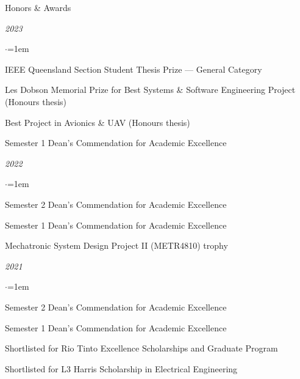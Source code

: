 \documentclass{resume} %
\begin{document}
\newpage

\begin{rSection}{Honors \& Awards} \itemsep -2pt

    \item \textit{2023}
    \begin{list}{$\cdot$}{\leftmargin=1em} %
        \item IEEE Queensland Section Student Thesis Prize --- General Category
        \item Les Dobson Memorial Prize for Best Systems \& Software Engineering Project (Honours thesis)
        \item Best Project in Avionics \& UAV (Honours thesis)
        \item Semester 1 Dean's Commendation for Academic Excellence
    \end{list}

    \vspace{1em}

    \item \textit{2022}
    \begin{list}{$\cdot$}{\leftmargin=1em}
        \item Semester 2 Dean's Commendation for Academic Excellence
        \item Semester 1 Dean's Commendation for Academic Excellence
        \item Mechatronic System Design Project II (METR4810) trophy
    \end{list}

    \vspace{1em}

    \item \textit{2021}
    \begin{list}{$\cdot$}{\leftmargin=1em}
        \item Semester 2 Dean's Commendation for Academic Excellence
        \item Semester 1 Dean's Commendation for Academic Excellence
        \item Shortlisted for Rio Tinto Excellence Scholarships and Graduate Program
        \item Shortlisted for L3 Harris Scholarship in Electrical Engineering
    \end{list}

    \vspace{1em}


\end{rSection}
\end{document}
